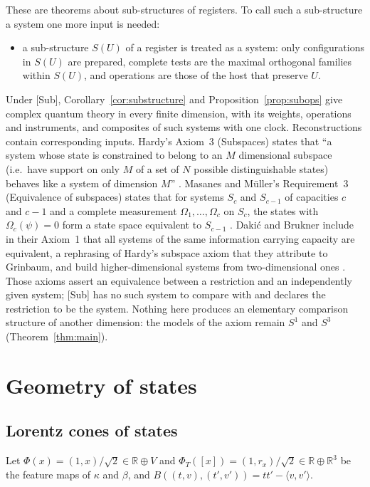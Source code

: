 \documentclass[aps,pra,onecolumn,superscriptaddress,nofootinbib,10pt]{revtex4-2}
\theoremstyle{definition}
\theoremstyle{remark}
\newcommand{\R}{\mathbb{R}}
\newcommand{\ip}[2]{\langle #1,#2\rangle}
\begin{document}
These are theorems about sub-structures of registers.  To call such a sub-structure a system one more
input is needed:
\begin{itemize}[leftmargin=3.2em]
\item[{[Sub]}] a sub-structure $S(U)$ of a register is treated as a system: only configurations in $S(U)$ are
prepared, complete tests are the maximal orthogonal families within $S(U)$, and operations are those of
the host that preserve $U$.
\end{itemize}
Under [Sub], Corollary~\ref{cor:substructure} and Proposition~\ref{prop:subops} give complex quantum theory in
every finite dimension, with its weights, operations and instruments, and composites of such systems
with one clock.  Reconstructions contain corresponding inputs.  Hardy's Axiom~3 (Subspaces) states that
``a system whose state is constrained to belong to an $M$ dimensional subspace (i.e.\ have support on only $M$
of a set of $N$ possible distinguishable states) behaves like a system of dimension $M$'' \cite{Hardy}.  Masanes
and M\"uller's Requirement~3 (Equivalence of subspaces) states that for systems $S_c$ and $S_{c-1}$ of capacities
$c$ and $c-1$ and a complete measurement $\Omega_1,\dots,\Omega_c$ on $S_c$, the states with $\Omega_c(\psi)=0$ form a state space
equivalent to $S_{c-1}$ \cite{MM}.  Daki\'c and Brukner include in their Axiom~1 that all systems of the same
information carrying capacity are equivalent, a rephrasing of Hardy's subspace axiom that they attribute to
Grinbaum, and build
higher-dimensional systems from two-dimensional ones \cite{DB}.  Those axioms assert an equivalence
between a restriction and an independently given system; [Sub] has no such system to compare with and
declares the restriction to be the system.  Nothing here produces an elementary comparison structure of
another dimension: the models of the axiom remain $S^1$ and $S^3$ (Theorem~\ref{thm:main}).

\section{Geometry of states}\label{sec:geometry}

\subsection{Lorentz cones of states}\label{sec:cone}
Let $\Phi(x)=(1,x)/\sqrt2\in\R\oplus V$ and $\Phi_T([x])=(1,r_x)/\sqrt2\in\R\oplus\R^3$ be the feature
maps of $\kappa$ and $\beta$, and $B((t,v),(t',v'))=tt'-\ip{v}{v'}$.
\end{document}
